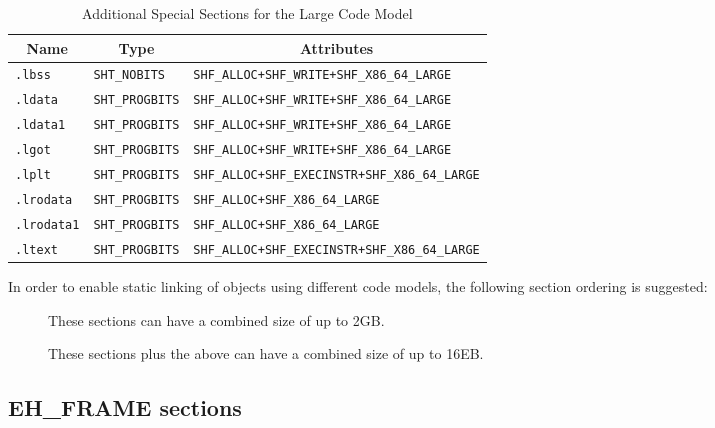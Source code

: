 \begin{table}[H]
\Hrule
  \caption{Additional Special Sections for the Large Code Model}
  \label{large_sections}
  \begin{center}
    \begin{tabular}[t]{l|l|l}
      \multicolumn{1}{c}{Name} & \multicolumn{1}{c}{Type}
       & \multicolumn{1}{c}{Attributes} \\
      \hline
      \texttt{.lbss} & \texttt{SHT_NOBITS} &
         \texttt{SHF_ALLOC+SHF_WRITE+SHF_X86_64_LARGE} \\
      \texttt{.ldata} & \texttt{SHT_PROGBITS} &
         \texttt{SHF_ALLOC+SHF_WRITE+SHF_X86_64_LARGE} \\
      \texttt{.ldata1} & \texttt{SHT_PROGBITS} &
         \texttt{SHF_ALLOC+SHF_WRITE+SHF_X86_64_LARGE} \\
      \texttt{.lgot} & \texttt{SHT_PROGBITS} &
         \texttt{SHF_ALLOC+SHF_WRITE+SHF_X86_64_LARGE} \\
      \texttt{.lplt} & \texttt{SHT_PROGBITS} &
         \texttt{SHF_ALLOC+SHF_EXECINSTR+SHF_X86_64_LARGE} \\
      \texttt{.lrodata} & \texttt{SHT_PROGBITS} &
         \texttt{SHF_ALLOC+SHF_X86_64_LARGE} \\
      \texttt{.lrodata1} & \texttt{SHT_PROGBITS} &
         \texttt{SHF_ALLOC+SHF_X86_64_LARGE} \\
      \texttt{.ltext} & \texttt{SHT_PROGBITS} &
         \texttt{SHF_ALLOC+SHF_EXECINSTR+SHF_X86_64_LARGE} \\
    \end{tabular}
  \end{center}
\Hrule
\end{table}

In order to enable static linking of objects using different code
models, the following section ordering is suggested:

\begin{description}
  \item[] These sections can have a combined size of up to 2GB.
  \item[] These sections plus the above can have a combined size of up
   to 16EB.
\end{description}

\subsection{EH\_FRAME sections}
\label{sec_eh_frame}

